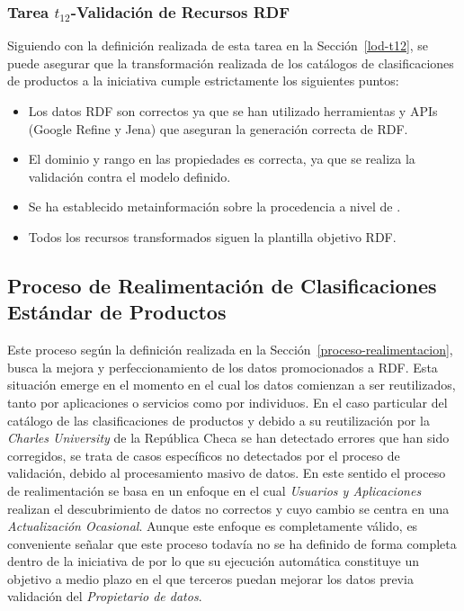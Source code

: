 \subsubsection{Tarea $t_{12}$-Validación de Recursos RDF}
Siguiendo con la definición realizada de esta tarea en la Sección~\ref{lod-t12}, se puede asegurar que la transformación 
realizada de los catálogos de clasificaciones de productos a la iniciativa \linkeddata cumple estrictamente los 
siguientes puntos:

\begin{itemize}
 \item Los datos \gls{RDF} son correctos ya que se han utilizado herramientas y \gls{API}s (Google \gls{Refine} y Jena) que aseguran 
la generación correcta de RDF.
 \item El dominio y rango en las propiedades es correcta, ya que se realiza la validación contra el modelo definido.
 \item Se ha establecido metainformación sobre la procedencia a nivel de \dataset.
 \item Todos los recursos transformados siguen la plantilla objetivo RDF.
\end{itemize}

\subsection{Proceso de Realimentación de Clasificaciones\\ Estándar de Productos}
Este proceso según la definición realizada en la Sección~\ref{proceso-realimentacion}, busca la mejora 
y perfeccionamiento de los datos promocionados a \gls{RDF}. Esta situación emerge en el momento en el cual 
los datos comienzan a ser reutilizados, tanto por aplicaciones o servicios como por individuos. En el caso 
particular del catálogo de las clasificaciones de productos y debido a su reutilización por la 
\textit{Charles University} de la República Checa se han detectado errores que han sido 
corregidos, se trata de casos específicos no detectados por el proceso de validación, debido al procesamiento masivo de datos. 
En este sentido el proceso de realimentación se basa en un enfoque en el cual \textit{Usuarios y Aplicaciones} realizan 
el descubrimiento de datos no correctos y cuyo cambio se centra en una \textit{Actualización Ocasional}. Aunque 
este enfoque es completamente válido, es conveniente señalar que este proceso todavía no se ha definido de forma 
completa dentro de la iniciativa de \linkeddata por lo que su ejecución automática constituye un objetivo 
a medio plazo en el que terceros puedan mejorar los datos previa validación del \textit{Propietario de datos}.
